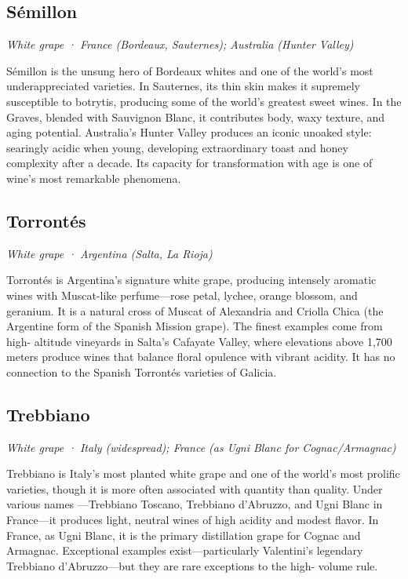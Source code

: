 \subsection*{Sémillon}
\textit{White grape · France (Bordeaux, Sauternes); Australia (Hunter Valley)}\par\smallskip

Sémillon is the unsung hero of Bordeaux whites and one of the world’s most underappreciated varieties. In Sauternes, its thin skin makes it supremely susceptible to botrytis, producing some of the world’s greatest sweet wines. In the Graves, blended with Sauvignon Blanc, it contributes body, waxy texture, and aging potential. Australia’s Hunter Valley produces an iconic unoaked style: searingly acidic when young, developing extraordinary toast and honey complexity after a decade. Its capacity for transformation with age is one of wine’s most remarkable phenomena.

\subsection*{Torrontés}
\textit{White grape · Argentina (Salta, La Rioja)}\par\smallskip

Torrontés is Argentina’s signature white grape, producing intensely aromatic wines with Muscat-like perfume—rose petal, lychee, orange blossom, and geranium. It is a natural cross of Muscat of Alexandria and Criolla Chica (the Argentine form of the Spanish Mission grape). The finest examples come from high- altitude vineyards in Salta’s Cafayate Valley, where elevations above 1,700 meters produce wines that balance floral opulence with vibrant acidity. It has no connection to the Spanish Torrontés varieties of Galicia.

\subsection*{Trebbiano}
\textit{White grape · Italy (widespread); France (as Ugni Blanc for Cognac/Armagnac)}\par\smallskip

Trebbiano is Italy’s most planted white grape and one of the world’s most prolific varieties, though it is more often associated with quantity than quality. Under various names —Trebbiano Toscano, Trebbiano d’Abruzzo, and Ugni Blanc in France—it produces light, neutral wines of high acidity and modest flavor. In France, as Ugni Blanc, it is the primary distillation grape for Cognac and Armagnac. Exceptional examples exist—particularly Valentini’s legendary Trebbiano d’Abruzzo—but they are rare exceptions to the high- volume rule.


